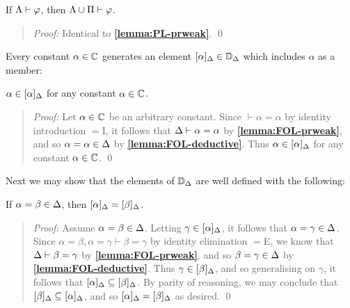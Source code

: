 \begin{Lthm} \label{lemma:FOL-prweak}
  If $\Lambda\vdash\varphi$, then $\Lambda\cup\Pi\vdash\varphi$.
\end{Lthm}

\begin{quote} 
  \textit{Proof:} 
  Identical to \textbf{\ref{lemma:PL-prweak}}.
  \qed
\end{quote}



Every constant $\alpha\in\mathbb{C}$ generates an element $[\alpha]_{\Delta}\in\mathbb{D}_{\Delta}$ which includes $\alpha$ as a member: 


\begin{Lthm} \label{lemma:FOL-nonempty}
  $\alpha\in[\alpha]_{\Delta}$ for any constant $\alpha\in\mathbb{C}$.
\end{Lthm}

\begin{quote} 
  \textit{Proof:} 
  Let $\alpha\in\mathbb{C}$ be an arbitrary constant. 
  Since $\vdash \alpha=\alpha$ by identity introduction $=$I, it follows that $\Delta\vdash\alpha=\alpha$ by \textbf{\ref{lemma:FOL-prweak}}, and so $\alpha=\alpha\in\Delta$ by \textbf{\ref{lemma:FOL-deductive}}.
  Thus $\alpha\in[\alpha]_{\Delta}$ for any constant $\alpha\in\mathbb{C}$.
  \qed
\end{quote}

Next we may show that the elements of $\mathbb{D}_{\Delta}$ are well defined with the following: 

\begin{Lthm} \label{lemma:FOL-define}
  If $\alpha=\beta\in\Delta$, then $[\alpha]_{\Delta}=[\beta]_{\Delta}$.
\end{Lthm}

\begin{quote} 
  \textit{Proof:}
  Assume $\alpha=\beta\in\Delta$.
  Letting $\gamma\in[\alpha]_{\Delta}$, it follows that $\alpha=\gamma\in\Delta$.
  Since $\alpha=\beta,\alpha=\gamma\vdash\beta=\gamma$ by identity elimination $=$E, we know that $\Delta\vdash\beta=\gamma$ by \textbf{\ref{lemma:FOL-prweak}}, and so $\beta=\gamma\in\Delta$ by \textbf{\ref{lemma:FOL-deductive}}. 
  Thus $\gamma\in[\beta]_{\Delta}$, and so generalising on $\gamma$, it follows that $[\alpha]_{\Delta}\subseteq[\beta]_{\Delta}$.
  By parity of reasoning, we may conclude that $[\beta]_{\Delta}\subseteq[\alpha]_{\Delta}$, and so $[\alpha]_{\Delta}=[\beta]_{\Delta}$ as desired.
  \qed
\end{quote}

